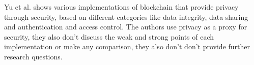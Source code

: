 \documentclass[conference]{IEEEtran}
\begin{document}













Yu et al. \cite{yu2018blockchain} shows various implementations of blockchain
that provide privacy through security, based on different categories like data
integrity, data sharing and authentication and access control. The authors
use privacy as a proxy for security, they also don't discuss the weak and
strong points of each implementation or make any comparison, they also don't
don't provide further research questions.
\end{document}
